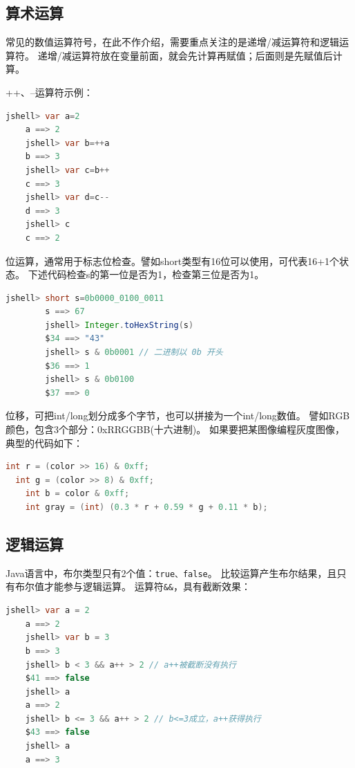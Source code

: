 \subsection{算术运算}
常见的数值运算符号，在此不作介绍，需要重点关注的是递增/减运算符和逻辑运算符。
递增/减运算符放在变量前面，就会先计算再赋值；后面则是先赋值后计算。
\begin{example} ++、--运算符示例：
\begin{lstlisting}[language=Java, backgroundcolor=\color{lightgray!10}]
	jshell> var a=2
	a ==> 2
	jshell> var b=++a
	b ==> 3
	jshell> var c=b++
	c ==> 3
	jshell> var d=c--
	d ==> 3
	jshell> c
	c ==> 2
\end{lstlisting}
\end{example}

位运算，通常用于标志位检查。譬如short类型有16位可以使用，可代表16+1个状态。
下述代码检查s的第一位是否为1，检查第三位是否为1。
\begin{example}
	\begin{lstlisting}[language=Java, backgroundcolor=\color{lightgray!10}]
		jshell> short s=0b0000_0100_0011
		s ==> 67
		jshell> Integer.toHexString(s)
		$34 ==> "43"
		jshell> s & 0b0001 // 二进制以 0b 开头
		$36 ==> 1
		jshell> s & 0b0100
		$37 ==> 0
	\end{lstlisting}
\end{example}

位移，可把int/long划分成多个字节，也可以拼接为一个int/long数值。
譬如RGB颜色，包含3个部分：0xRRGGBB(十六进制)。
如果要把某图像编程灰度图像，典型的代码如下：

\begin{lstlisting}[language=Java]
	int r = (color >> 16) & 0xff;
  int g = (color >> 8) & 0xff;
	int b = color & 0xff;
	int gray = (int) (0.3 * r + 0.59 * g + 0.11 * b);
\end{lstlisting}


\subsection{逻辑运算}
Java语言中，布尔类型只有2个值：\lstinline[language=Java]{true、false}。
比较运算产生布尔结果，且只有布尔值才能参与逻辑运算。
运算符\lstinline{&&}，具有截断效果：

\begin{lstlisting}[language=Java, backgroundcolor=\color{lightgray!10}]
	jshell> var a = 2
	a ==> 2
	jshell> var b = 3
	b ==> 3
	jshell> b < 3 && a++ > 2 // a++被截断没有执行
	$41 ==> false
	jshell> a
	a ==> 2
	jshell> b <= 3 && a++ > 2 // b<=3成立，a++获得执行
	$43 ==> false
	jshell> a
	a ==> 3
\end{lstlisting}

